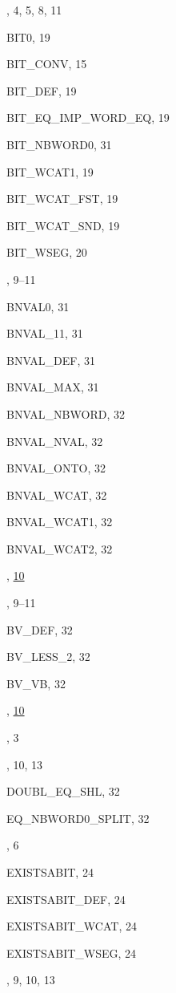 \begin{theindex}
  \item {}, 4, 5, 8, 11
  \item {\ptt BIT0}, 19
  \item {\ptt BIT\_CONV}, 15
  \item {\ptt BIT\_DEF}, 19
  \item {\ptt BIT\_EQ\_IMP\_WORD\_EQ}, 19
  \item {\ptt BIT\_NBWORD0}, 31
  \item {\ptt BIT\_WCAT1}, 19
  \item {\ptt BIT\_WCAT\_FST}, 19
  \item {\ptt BIT\_WCAT\_SND}, 19
  \item {\ptt BIT\_WSEG}, 20
  \item {}, 9--11
  \item {\ptt BNVAL0}, 31
  \item {\ptt BNVAL\_11}, 31
  \item {\ptt BNVAL\_DEF}, 31
  \item {\ptt BNVAL\_MAX}, 31
  \item {\ptt BNVAL\_NBWORD}, 32
  \item {\ptt BNVAL\_NVAL}, 32
  \item {\ptt BNVAL\_ONTO}, 32
  \item {\ptt BNVAL\_WCAT}, 32
  \item {\ptt BNVAL\_WCAT1}, 32
  \item {\ptt BNVAL\_WCAT2}, 32
  \item {}, \ul{10}
  \item {}, 9--11
  \item {\ptt BV\_DEF}, 32
  \item {\ptt BV\_LESS\_2}, 32
  \item {\ptt BV\_VB}, 32
  \item {}, \ul{10}

  \indexspace

  \item {}, 3
  \item {}, 10, 13
  \item {\ptt DOUBL\_EQ\_SHL}, 32

  \indexspace

  \item {\ptt EQ\_NBWORD0\_SPLIT}, 32
  \item {}, 6
  \item {\ptt EXISTSABIT}, 24
  \item {\ptt EXISTSABIT\_DEF}, 24
  \item {\ptt EXISTSABIT\_WCAT}, 24
  \item {\ptt EXISTSABIT\_WSEG}, 24
  \item {}, 9, 10, 13


\end{theindex}
